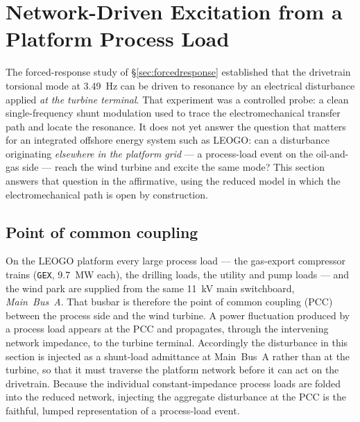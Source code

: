 
\section{Network-Driven Excitation from a Platform Process Load}
\label{sec:network-excitation}

The forced-response study of \S\ref{sec:forcedresponse} established that the
drivetrain torsional mode at \SI{3.49}{\hertz} can be driven to resonance by an
electrical disturbance applied \emph{at the turbine terminal}. That experiment
was a controlled probe: a clean single-frequency shunt modulation used to trace
the electromechanical transfer path and locate the resonance. It does not yet
answer the question that matters for an integrated offshore energy system such
as LEOGO: can a disturbance originating \emph{elsewhere in the platform grid}
--- a process-load event on the oil-and-gas side --- reach the wind turbine and
excite the same mode? This section answers that question in the affirmative,
using the reduced model in which the electromechanical path is open by
construction.

\subsection{Point of common coupling}
\label{subsec:ne-pcc}

On the LEOGO platform every large process load --- the gas-export compressor
trains (\texttt{GEX}, \SI{9.7}{\mega\watt} each), the drilling loads, the
utility and pump loads --- and the wind park are supplied from the same
\SI{11}{\kilo\volt} main switchboard, \emph{Main~Bus~A}. That busbar is
therefore the point of common coupling (PCC) between the process side and the
wind turbine. A power fluctuation produced by a process load appears at the PCC
and propagates, through the intervening network impedance, to the turbine
terminal. Accordingly the disturbance in this section is injected as a
shunt-load admittance at Main~Bus~A rather than at the turbine, so that it must
traverse the platform network before it can act on the drivetrain. Because the
individual constant-impedance process loads are folded into the reduced network,
injecting the aggregate disturbance at the PCC is the faithful, lumped
representation of a process-load event.

